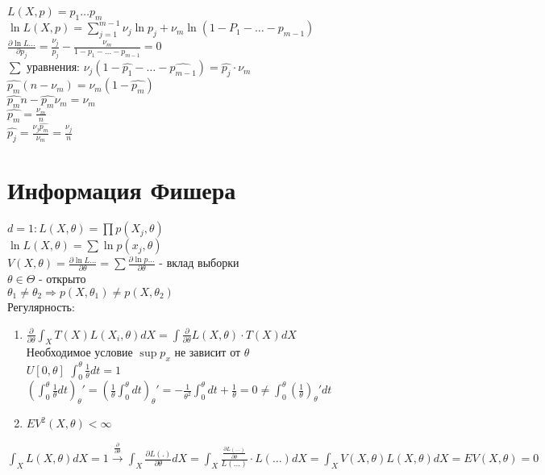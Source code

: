 \documentclass{article}
\newcommand\0{\mathbb{0}}
\newcommand\1{\mathbb{1}}
\begin{document}
$L(X, p) = p_1 \dots p_m$\\
$\ln{L(X, p)} = \displaystyle\sum_{j = 1}^{m - 1}\nu_j \ln{p_j} + \nu_m \ln{(1 - P_1 - \dots - p_{m - 1})}$\\
$\frac{\partial \ln{L\dots}}{\partial p_j} = \frac{\nu_j}{p_j} - \frac{\nu_m}{1 - p_1 - \dots - p_{m - 1}} = 0$\\
$\displaystyle\sum$ уравнения: $\nu_j(1 - \widehat{p_1} - \dots - \widehat{p_{m - 1}}) = \widehat{p_j} \cdot \nu_m$\\
$\widehat{p_m}(n - \nu_m) = \nu_m (1 - \widehat{p_m})$\\
$\widehat{p_m}n - \widehat{p_m}\nu_m = \nu_m$\\
$\widehat{p_m} = \frac{\nu_m}{n}$\\
$\widehat{p_j} = \frac{\nu_j \widehat{p_m}}{\nu_m} = \frac{\nu_j}{n}$
\section{Информация Фишера}
$d = 1: L(X, \theta) = \displaystyle\prod p(X_j, \theta)$\\
$\ln{L(X, \theta)} = \displaystyle\sum \ln{p(x_j, \theta)}$\\
$V(X, \theta) = \frac{\partial \ln{L\dots}}{\partial \theta} = \displaystyle\sum \frac{\partial \ln{p\dots}}{\partial \theta}$ - вклад выборки\\
$\theta \in \Theta$ - открыто\\
$\theta_1 \neq \theta_2 \Rightarrow p(X, \theta_1) \neq p(X, \theta_2)$\\
Регулярность:\\
\begin{enumerate}
    \item $\frac{\partial}{\partial \theta} \displaystyle\int_X T(X) L(X_i, \theta)dX = \displaystyle\int \frac{\partial}{\partial \theta}L(X, \theta) \cdot T(X) dX$\\
    Необходимое условие $\sup p_x$ не зависит от $\theta$\\
    $U[0, \theta]$ $\displaystyle\int_{0}^{\theta} \frac{1}{\theta}dt = 1$\\
    $(\displaystyle\int_0^{\theta} \frac{1}{\theta}dt)_{\theta}' = (\frac{1}{\theta}\displaystyle\int_0^\theta dt)_\theta' = -\frac{1}{\theta^2} \displaystyle\int_0^\theta dt + \frac{1}{\theta} = 0 \neq \displaystyle\int_0^\theta(\frac{1}{\theta})_\theta' dt$
    \item $EV^2(X, \theta) < \infty$
\end{enumerate}
$\displaystyle\int_X L(X, \theta)dX = 1 \xrightarrow[]{\frac{\partial}{\partial \theta}} \displaystyle\int_X \frac{\partial L(.)}{\partial \theta}dX = \displaystyle\int_X \frac{\frac{\partial L(\dots)}{\partial \theta}}{L(\dots)} \cdot L(\dots) dX = \displaystyle\int_X V(X, \theta) L(X, \theta) dX = EV(X, \theta) = 0$\\
\end{document}
